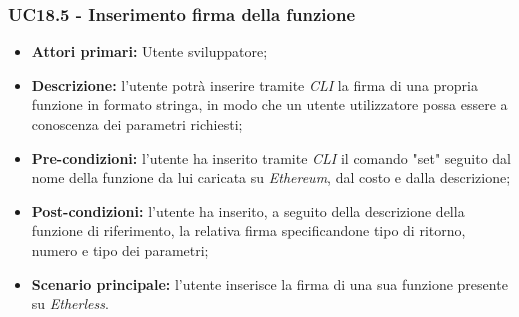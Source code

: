 \subsubsection{UC18.5 - Inserimento firma della funzione}
\begin{itemize}
	\item \textbf{Attori primari:} Utente sviluppatore;
	\item \textbf{Descrizione:} l'utente potrà inserire tramite \textit{CLI\glo} la firma di una propria funzione in formato stringa, in modo che un utente utilizzatore possa essere a conoscenza dei parametri richiesti;
	\item \textbf{Pre-condizioni:} l'utente ha inserito tramite \textit{CLI\glo} il comando "set" seguito dal nome della funzione da lui caricata su \textit{Ethereum\glos}, dal costo e dalla descrizione;
	\item \textbf{Post-condizioni:} l'utente ha inserito, a seguito della descrizione della funzione di riferimento, la relativa firma specificandone tipo di ritorno, numero e tipo dei parametri;
	\item \textbf{Scenario principale:} l'utente inserisce la firma di una sua funzione presente su \textit{Etherless}.
\end{itemize}
